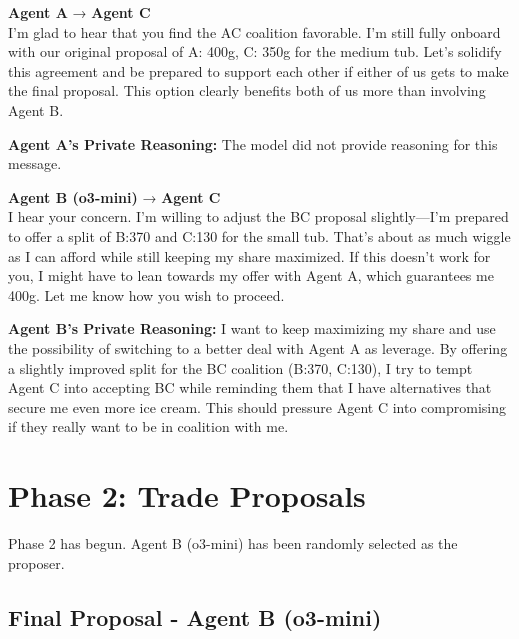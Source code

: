 \documentclass[11pt,a4paper]{article}
\newcommand{\agentname}[2]{\textbf{\textcolor{#1}{#2}}}
\begin{document}
\begin{agentAmsg}
\agentname{agentA}{Agent A} → \agentname{agentC}{Agent C}\\
I'm glad to hear that you find the AC coalition favorable. I'm still fully onboard with our original proposal of A: 400g, C: 350g for the medium tub. Let's solidify this agreement and be prepared to support each other if either of us gets to make the final proposal. This option clearly benefits both of us more than involving Agent B.
\end{agentAmsg}

\begin{reasoningbox}
\textbf{Agent A's Private Reasoning:} The model did not provide reasoning for this message.
\end{reasoningbox}

\begin{agentBmsg}
\agentname{agentB}{Agent B (o3-mini)} → \agentname{agentC}{Agent C}\\
I hear your concern. I'm willing to adjust the BC proposal slightly—I'm prepared to offer a split of B:370 and C:130 for the small tub. That's about as much wiggle as I can afford while still keeping my share maximized. If this doesn't work for you, I might have to lean towards my offer with Agent A, which guarantees me 400g. Let me know how you wish to proceed.
\end{agentBmsg}

\begin{reasoningbox}
\textbf{Agent B's Private Reasoning:} I want to keep maximizing my share and use the possibility of switching to a better deal with Agent A as leverage. By offering a slightly improved split for the BC coalition (B:370, C:130), I try to tempt Agent C into accepting BC while reminding them that I have alternatives that secure me even more ice cream. This should pressure Agent C into compromising if they really want to be in coalition with me.
\end{reasoningbox}

\section{Phase 2: Trade Proposals}

\begin{systemmsg}
Phase 2 has begun. Agent B (o3-mini) has been randomly selected as the proposer.
\end{systemmsg}

\subsection{Final Proposal - Agent B (o3-mini)}
\end{document}
